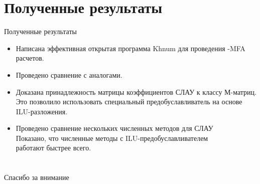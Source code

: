 \documentclass[aspectratio=169]{beamer}
\begin{document}
\section{Полученные результаты}
\begin{frame}{Полученные результаты}
	\begin{itemize}
		\item Написана эффективная открытая программа Khnum для проведения -MFA расчетов.
		\item Проведено сравнение с аналогами.
		\item Доказана принадлежность матрицы коэффициентов СЛАУ к классу М-матриц. Это позволило использовать специальный предобуславливатель на основе ILU-разложения.
		\item Проведено сравнение нескольких численных методов для СЛАУ \\ Показано, что численные методы с ILU-предобуславливателем\\ работают быстрее всего.
	\end{itemize}
\end{frame}

\section*{}
\begin{frame}
	\centering
	\Large
	Спасибо за внимание
\end{frame}
\end{document}
